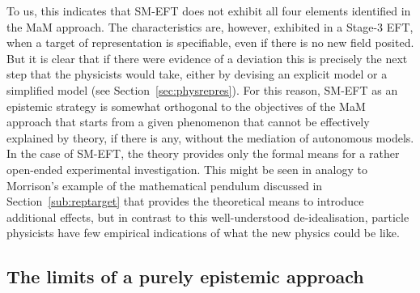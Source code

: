 To us, this indicates that SM-EFT does not exhibit all four elements identified in the MaM approach. 
The characteristics are, however, exhibited in a Stage-3 EFT, when a target of representation is specifiable, even if there is no new field posited.  
But it is clear that if there were evidence of a deviation this is precisely the next step that the physicists would take, either by devising an explicit model or a simplified model (see Section~\ref{sec:physrepres}). 
For this reason, SM-EFT as an epistemic strategy is somewhat orthogonal to the objectives of the MaM approach that starts from a given phenomenon that cannot be effectively explained by theory, if there is any, without the mediation of autonomous models. In the case of SM-EFT, the theory provides only the formal means for a rather open-ended experimental investigation. 
This might be seen in analogy to Morrison's example of the mathematical pendulum discussed in Section~\ref{sub:reptarget} that provides the theoretical means to introduce additional effects, but in contrast to this well-understood de-idealisation, particle physicists have few empirical indications of what the new physics could be like.


\subsection{The limits of a purely epistemic approach} \label{sub:epistemic}

